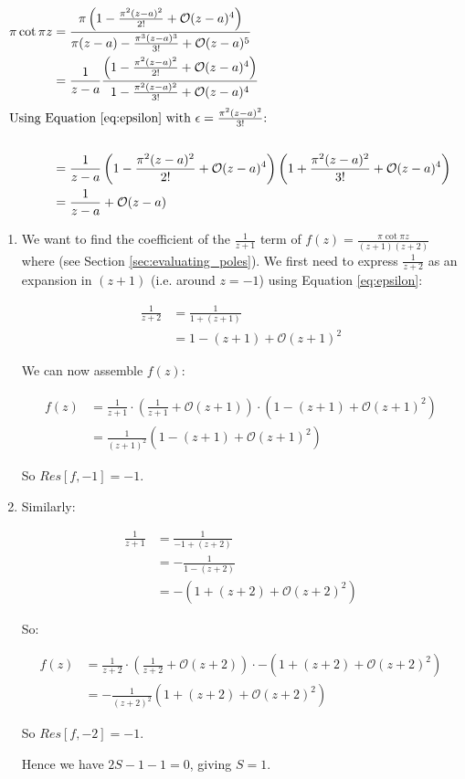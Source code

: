 \documentclass{physics_notes}
\begin{document}
\begin{align*}
	\pi \cot{\pi z} &= \frac{\pi\left(1 - \frac{\pi^2(z-a)^2}{2!} + \mathcal{O}(z-a)^4\right)}{\pi (z-a) - \frac{\pi^3 (z-a)^3}{3!} + \mathcal{O}(z-a)^5} \\
	&= \frac{1}{z-a}\frac{\left(1 - \frac{\pi^2(z-a)^2}{2!} + \mathcal{O}(z-a)^4\right)}{1 - \frac{\pi^2 (z-a)^2}{3!} + \mathcal{O}(z-a)^4} \\
	\intertext{Using Equation \ref{eq:epsilon} with $\epsilon=\frac{\pi^2 (z-a)^2}{3!}$:} \\
	&= \frac{1}{z-a}\left(1 - \frac{\pi^2(z-a)^2}{2!} + \mathcal{O}(z-a)^4\right)\left(1 + \frac{\pi^2 (z-a)^2}{3!} + \mathcal{O}(z-a)^4\right) \\
	&= \frac{1}{z-a} + \mathcal{O}(z-a)
\end{align*}

\begin{enumerate}[label={$z_0 =-\arabic*$:}]
	\item{
		We want to find the coefficient of the $\frac{1}{z+1}$ term of $f(z) = \frac{\pi\cot{\pi z}}{(z+1)(z+2)}$ where (see Section \ref{sec:evaluating_poles}). We first need to express $\frac{1}{z+2}$ as an expansion in $(z+1)$ (i.e. around $z=-1$) using Equation \ref{eq:epsilon}:

		\begin{align*}
			\frac{1}{z+2} &= \frac{1}{1+(z+1)} \\
			&= 1 - (z+1) + \mathcal{O}(z+1)^2
		\end{align*}

		We can now assemble $f(z)$:

		\begin{align*} 
			f(z) &= \frac{1}{z+1}\cdot\left(\frac{1}{z+1} + \mathcal{O}(z+1)\right)\cdot\left(1 - (z+1) + \mathcal{O}(z+1)^2\right)\\
			&= \frac{1}{(z+1)^2}\left(1-(z+1) + \mathcal{O}(z+1)^2\right)
		 \end{align*}

		 So $Res[f,-1] = -1$.
	}
	\item{
		Similarly:

		\begin{align*}
			\frac{1}{z+1} &= \frac{1}{-1+(z+2)} \\
			&= -\frac{1}{1-(z+2)} \\
			&= -(1 + (z+2) + \mathcal{O}(z+2)^2)
		\end{align*}

		So:

		\begin{align*} 
			f(z) &= \frac{1}{z+2}\cdot\left(\frac{1}{z+2} + \mathcal{O}(z+2)\right)\cdot-\left(1 + (z+2) + \mathcal{O}(z+2)^2\right)\\
			&= -\frac{1}{(z+2)^2}\left(1+(z+2) + \mathcal{O}(z+2)^2\right)
		 \end{align*}

		 So $Res[f,-2] = -1$.
	}

	Hence we have $2S-1-1=0$, giving $S=1$.
\end{enumerate}

\newpage
\printindex
\end{document}
